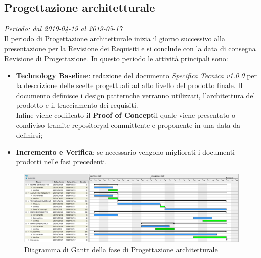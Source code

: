 \subsection{Progettazione architetturale}
\textit{Periodo: dal 2019-04-19 al 2019-05-17} \\
Il periodo di Progettazione architetturale inizia il giorno successivo alla presentazione per la Revisione dei Requisiti e si conclude con la data di consegna Revisione di 
Progettazione. In questo periodo le attività principali sono:
\begin{itemize}
	\item \textbf{Technology Baseline}: redazione del documento \textit{Specifica Tecnica v1.0.0} per la descrizione delle scelte progettuali ad alto livello del prodotto finale.
	Il documento definisce i design pattern\glosp che verranno utilizzati, l'architettura del prodotto e il tracciamento dei requisiti.\\
	Infine viene codificato il \textbf{Proof of Concept}\glosp il 
	quale viene presentato o condiviso tramite repository\glosp al committente e 
	proponente in una data da definirsi;
	\item \textbf{Incremento e Verifica}: se necessario vengono migliorati i 
	documenti prodotti nelle fasi precedenti.
\end{itemize}

\begin{figure}[H]
	\includegraphics[width=0.99\linewidth]{res/images/gantt_pa.png}
	\caption{Diagramma di Gantt della fase di Progettazione architetturale}
\end{figure}


